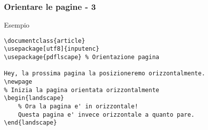 \begin{frame}[fragile]
 \frametitle{Orientare le pagine - 3}
 \begin{exampleblock}{Esempio}
  \begin{lstlisting}[frame = single, title={Ruotare una pagina}] 
\documentclass{article}
\usepackage[utf8]{inputenc}
\usepackage{pdflscape} % Orientazione pagina

Hey, la prossima pagina la posizioneremo orizzontalmente.
\newpage
% Inizia la pagina orientata orizzontalmente
\begin{landscape}
    % Ora la pagina e' in orizzontale!
    Questa pagina e' invece orizzontale a quanto pare.
\end{landscape}

  \end{lstlisting}
 \end{exampleblock}

\end{frame}
